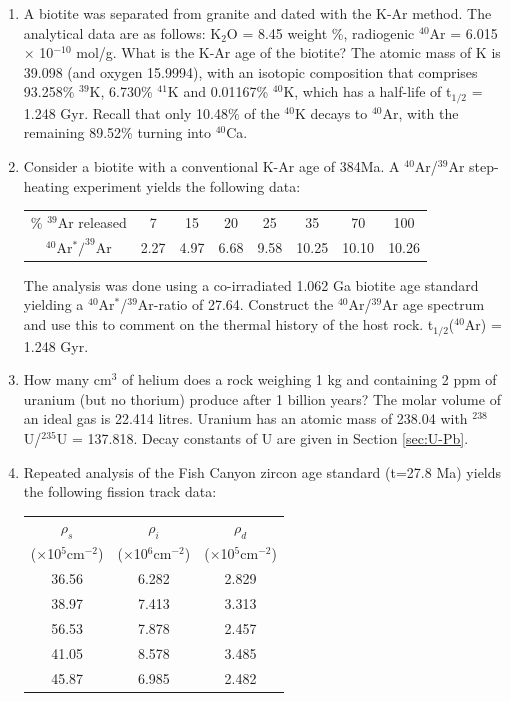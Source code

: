 \begin{enumerate}
\item A biotite was separated from granite and dated with the K-Ar
  method. The analytical data are as follows: K$_2$O = 8.45 weight \%,
  radiogenic $^{40}$Ar = 6.015 $\times$ 10$^{-10}$ mol/g.  What is the
  K-Ar age of the biotite? The atomic mass of K is 39.098 (and oxygen
  15.9994), with an isotopic composition that comprises 93.258\%
  $^{39}$K, 6.730\% $^{41}$K and 0.01167\% $^{40}$K, which has a
  half-life of t$_{1/2}$ = 1.248 Gyr. Recall that only 10.48\% of the
  $^{40}$K decays to $^{40}$Ar, with the remaining 89.52\% turning
  into $^{40}$Ca. 

\item Consider a biotite with a conventional K-Ar age of 384Ma. A
  $^{40}$Ar/$^{39}$Ar step-heating experiment yields the following
  data:

\begin{centering}
\begin{tabular}{c@{~}|@{~}c@{~}c@{~}c@{~}c@{~}c@{~}c@{~}c}
\% $^{39}$Ar released & 7 & 15 & 20 & 25 & 35 & 70 & 100\\
$^{40}$Ar$^*/^{39}$Ar & 2.27 & 4.97 & 6.68 & 9.58 & 10.25 & 10.10 & 10.26 \\
\end{tabular}
\end{centering}

The analysis was done using a co-irradiated 1.062 Ga biotite age
standard yielding a $^{40}$Ar$^*$/$^{39}$Ar-ratio of 27.64.  Construct
the $^{40}$Ar/$^{39}$Ar age spectrum and use this to comment on the
thermal history of the host rock. t$_{1/2}$($^{40}$Ar) = 1.248
Gyr.\\ 

\item How many cm$^3$ of helium does a rock weighing 1 kg and
  containing 2 ppm of uranium (but no thorium) produce after 1 billion
  years? The molar volume of an ideal gas is 22.414 litres. Uranium
  has an atomic mass of 238.04 with $^{238}$U/$^{235}$U =
  137.818. Decay constants of U are given in Section \ref{sec:U-Pb}.

\item Repeated analysis of the Fish Canyon zircon age standard (t=27.8
  Ma) yields the following fission track data:
  
\begin{centering}
\begin{tabular}{ccc}
$\rho_s$ & $\rho_i$ & $\rho_d$ \\
($\times$10$^5$cm$^{-2}$) & ($\times$10$^6$cm$^{-2}$) & ($\times$10$^5$cm$^{-2}$)\\
\hline
36.56 & 6.282 & 2.829 \\
38.97 & 7.413 & 3.313 \\
56.53 & 7.878 & 2.457 \\
41.05 & 8.578 & 3.485 \\
45.87 & 6.985 & 2.482
\end{tabular}
\end{centering}


\end{enumerate}
